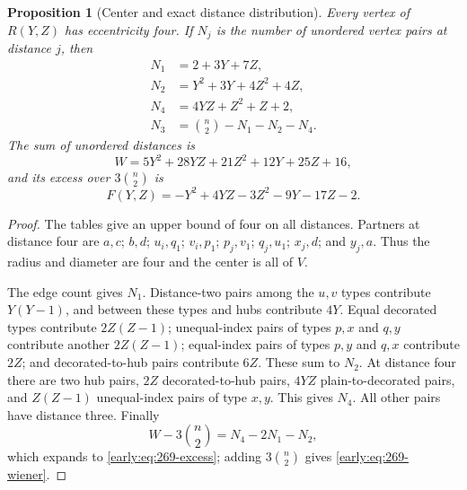 \documentclass[11pt,a4paper]{article}
\newtheorem{proposition}[theorem]{Proposition}
\theoremstyle{definition}\newtheorem{definition}[theorem]{Definition}
\theoremstyle{remark}\newtheorem{remark}[theorem]{Remark}
\begin{document}
\begin{proposition}[Center and exact distance distribution]
\label{early:prop:269-count}
Every vertex of $R(Y,Z)$ has eccentricity four.  If $N_j$ is the
number of unordered vertex pairs at distance $j$, then
\begin{align*}
 N_1&=2+3Y+7Z,\\
 N_2&=Y^2+3Y+4Z^2+4Z,\\
 N_4&=4YZ+Z^2+Z+2,\\
 N_3&=\binom n2-N_1-N_2-N_4.
\end{align*}
The sum of unordered distances is
\begin{equation}
 W=5Y^2+28YZ+21Z^2+12Y+25Z+16,
 \label{early:eq:269-wiener}
\end{equation}
and its excess over $3\binom n2$ is
\begin{equation}
 F(Y,Z)=-Y^2+4YZ-3Z^2-9Y-17Z-2.
 \label{early:eq:269-excess}
\end{equation}
\end{proposition}
\begin{proof}
The tables give an upper bound of four on all distances.  Partners
at distance four are $a,c$; $b,d$; $u_i,q_1$; $v_i,p_1$;
$p_j,v_1$; $q_j,u_1$; $x_j,d$; and $y_j,a$.
Thus the radius and diameter are four and the center is all of $V$.

The edge count gives $N_1$.  Distance-two pairs among the $u,v$ types
contribute $Y(Y-1)$, and between these types and hubs contribute
$4Y$.  Equal decorated types contribute $2Z(Z-1)$; unequal-index
pairs of types $p,x$ and $q,y$ contribute another $2Z(Z-1)$;
equal-index pairs of types $p,y$ and $q,x$ contribute $2Z$; and
decorated-to-hub pairs contribute $6Z$.  These sum to $N_2$.
At distance four there are two hub pairs, $2Z$ decorated-to-hub
pairs, $4YZ$ plain-to-decorated pairs, and $Z(Z-1)$ unequal-index
pairs of type $x,y$.  This gives $N_4$.  All other pairs have
distance three.  Finally
\[
 W-3\binom n2=N_4-2N_1-N_2,
\]
which expands to \eqref{early:eq:269-excess}; adding $3\binom n2$
gives \eqref{early:eq:269-wiener}.
\end{proof}
\end{document}
